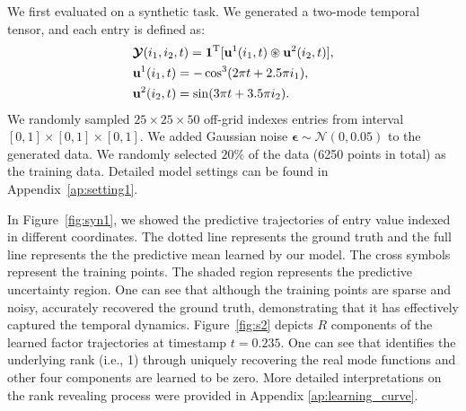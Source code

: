 We first evaluated \MODEL  on a synthetic  task.
We generated a two-mode temporal tensor,  and each entry is defined as: 
\begin{equation}
\begin{split}
    	&\mbox{\boldmath $\mathcal{Y}$}(i_1,  i_2,  t) = \boldsymbol{1}^{\mathrm{T}} [\mathbf{u}^{1}(i_1, t)\circledast \mathbf{u}^{2}(i_2, t)], \\
     & \mathbf{u}^{1}(i_1, t)= -\cos^{3}(2\pi t + 2.5\pi i_1), \\
     & \mathbf{u}^{2}(i_2, t)= \sin(3\pi t+3.5\pi i_2).
\end{split}
\label{eq:syn}
\end{equation}
We randomly sampled $25\times 25 \times 50$ off-grid indexes entries from interval $ [0, 1] \times [0, 1] \times [0, 1]$.
We added  Gaussian noise $\boldsymbol{\epsilon} \sim \mathcal{N}(0,  0.05) $ to the  generated data.
We  randomly selected $20\%$ of the data (6250 points in total) as the training data. Detailed model settings can be found in Appendix~\ref{ap:setting1}.


In Figure~\ref{fig:syn1},  we showed  the predictive trajectories of entry value  indexed in different coordinates. 
The dotted line represents the ground truth and the full line represents the  the predictive mean  learned by our model. The cross symbols represent the training points. The shaded region represents  the predictive   uncertainty region.
One can see that although the training points are sparse and noisy,   \MODEL  accurately recovered the ground truth,  demonstrating that it has effectively captured the  temporal dynamics. 
Figure~\ref{fig:s2}  depicts $R$ components of the learned  factor trajectories   at timestamp $t=0.235$.
 One can see that \MODEL  identifies the underlying rank (i.e.,  1) through uniquely  recovering the real mode functions and other four components are learned to be zero. More detailed interpretations on the rank revealing   process  were   provided  in Appendix \ref{ap:learning_curve}.











